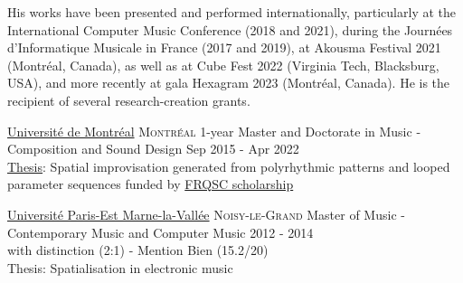 \documentclass[10pt,a4paper]{article}
\begin{document}
\vspace{1em}
His works have been presented and performed internationally, particularly at the International Computer Music Conference (2018 and 2021), during the Journées d’Informatique Musicale in France (2017 and 2019), at Akousma Festival 2021 (Montréal, Canada), as well as at Cube Fest 2022 (Virginia Tech, Blacksburg, USA), and more recently at gala Hexagram 2023 (Montréal, Canada). He is the recipient of several research-creation grants.


\vspace{0.2em}

\spacedhrule{0.9em}{-0.4em}



\vspace{0.2em}

\headedsection
  {\href{https://admission.umontreal.ca/programmes/doctorat-en-musique-option-composition-et-creation-sonore/}{Universit\'e de Montr\'eal}}
  {\textsc{Montréal}} {%
  \headedsubsection
    {1-year Master and Doctorate in Music - Composition and Sound Design}
    {Sep 2015 - Apr 2022}
    {
    \\{\href{https://www.researchgate.net/publication/360018268}{Thesis}}: Spatial improvisation generated from polyrhythmic patterns and looped parameter sequences funded by {\href{https://frq.gouv.qc.ca/en/society-and-culture/}{FRQSC scholarship}}
    }
}

\vspace{0.7em}

\headedsection
  {\href{http://www.u-pem.fr/formations/loffre-de-formations/masters/domaine-arts-lettres-langues/mention-arts-lettres-civilisations/master-musique-et-informatique-musicale/}{Universit\'e Paris-Est Marne-la-Vall\'ee}}
  {\textsc{Noisy-le-Grand}} {%
  \headedsubsection
    {Master of Music - Contemporary Music and Computer Music}
    {2012 - 2014}
    {\\with distinction (2:1) - Mention Bien (15.2/20)
    \\Thesis: Spatialisation in electronic music
    }
}

\vspace{0.7em}

\end{document}

